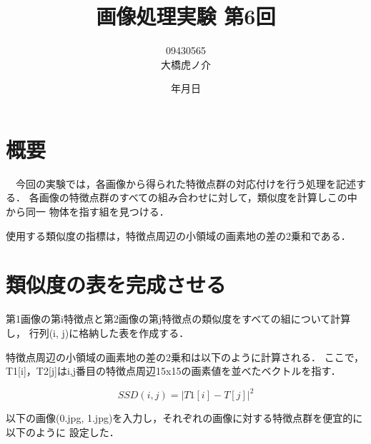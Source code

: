 \documentclass[11pt]{jarticle}
\begin{document}
\title{画像処理実験 第6回}
\author{09430565\\大橋虎ノ介}
\date{\number\year 年\number\month 月\number\day 日}
\maketitle

\section{概要}

　今回の実験では，各画像から得られた特徴点群の対応付けを行う処理を記述する．
各画像の特徴点群のすべての組み合わせに対して，類似度を計算しこの中から同一
物体を指す組を見つける．

使用する類似度の指標は，特徴点周辺の小領域の画素地の差の2乗和である．

\section{類似度の表を完成させる}

第1画像の第i特徴点と第2画像の第j特徴点の類似度をすべての組について計算し，
行列(i, j)に格納した表を作成する．

特徴点周辺の小領域の画素地の差の2乗和は以下のように計算される．
ここで，T1[i]，T2[j]はi,j番目の特徴点周辺15x15の画素値を並べたベクトルを指す．

\[ SSD(i,j) = | T1[i] - T[j] |^{2} \]

以下の画像(0.jpg, 1.jpg)を入力し，それぞれの画像に対する特徴点群を便宜的に以下のように
設定した．
\end{document}
